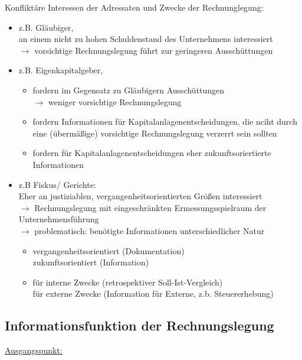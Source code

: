 \documentclass[paper=a4, fontsize=11pt]{scrartcl}
\numberwithin{equation}{section}
\numberwithin{figure}{section}
\numberwithin{table}{section}
\begin{document}
Konfliktäre Interessen der Adressaten und Zwecke der Rechnunglegung: \\
\begin{itemize}
\item z.B. Gläubiger, \\
an einem nicht zu hohen Schuldenstand des Unternehmens interessiert \\
$\rightarrow$ vorsichtige Rechnungslegung führt zur geringeren Ausschüttungen

\item z.B. Eigenkapitalgeber,
  \begin{itemize}
  \item fordern im Gegensatz zu Gläubigern Ausschüttungen \\
$\rightarrow$ weniger vorsichtige Rechnungslegung
  \item fordern Informationen für Kapitalanlagenentscheidungen, die nciht durch eine (übermäßige) vorsichtige Rechnungslegung verzerrt sein sollten
  \item fordern für Kapitalanlagenentscheidungen eher zukunftsoriertierte Informationen
\end{itemize}

\item z.B Fiskus/ Gerichte: \\
Eher an justiziablen, vergangenheitsorientierten Größen interessiert \\
$\rightarrow$ Rechnungslegung mit eingeschränkten Ermessungsspielraum der Unternehmensführung \\
$\rightarrow$ problematisch:  benötigte Informationen unterschiedlicher Natur \\
  \begin{itemize}
  \item vergangenheitsorientiert (Dokumentation) \\
zukunftsorientiert (Information)
  \item für interne Zwecke (retrospektiver Soll-Ist-Vergleich) \\
für externe Zwecke (Information für Externe, z.b. Steuererhebung)
\end{itemize}
\end{itemize}


\subsection{Informationsfunktion der Rechnungslegung}
\underline{Ausgangspunkt:}
\end{document}
